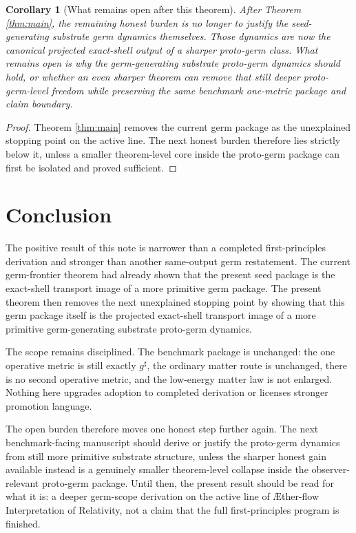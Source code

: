 \documentclass[11pt]{article}
\newcommand{\Aflow}{\AE{}ther-flow}
\newcommand{\TheoryName}{\Aflow{} Interpretation of Relativity}
\newcommand{\CompletedMetric}{g^{\sharp}}
\newtheorem{corollary}{Corollary}
\begin{document}
\begin{corollary}[What remains open after this theorem]
\label{cor:next}
After Theorem \ref{thm:main}, the remaining honest burden is no longer to justify the seed-generating substrate germ dynamics themselves. Those dynamics are now the canonical projected exact-shell output of a sharper proto-germ class. What remains open is why the germ-generating substrate proto-germ dynamics should hold, or whether an even sharper theorem can remove that still deeper proto-germ-level freedom while preserving the same benchmark one-metric package and claim boundary.
\end{corollary}

\begin{proof}
Theorem \ref{thm:main} removes the current germ package as the unexplained stopping point on the active line. The next honest burden therefore lies strictly below it, unless a smaller theorem-level core inside the proto-germ package can first be isolated and proved sufficient.
\end{proof}

\section{Conclusion}

The positive result of this note is narrower than a completed first-principles derivation and stronger than another same-output germ restatement. The current germ-frontier theorem had already shown that the present seed package is the exact-shell transport image of a more primitive germ package. The present theorem then removes the next unexplained stopping point by showing that this germ package itself is the projected exact-shell transport image of a more primitive germ-generating substrate proto-germ dynamics.

The scope remains disciplined. The benchmark package is unchanged: the one operative metric is still exactly \(\CompletedMetric\), the ordinary matter route is unchanged, there is no second operative metric, and the low-energy matter law is not enlarged. Nothing here upgrades adoption to completed derivation or licenses stronger promotion language.

The open burden therefore moves one honest step further again. The next benchmark-facing manuscript should derive or justify the proto-germ dynamics from still more primitive substrate structure, unless the sharper honest gain available instead is a genuinely smaller theorem-level collapse inside the observer-relevant proto-germ package. Until then, the present result should be read for what it is: a deeper germ-scope derivation on the active line of \TheoryName{}, not a claim that the full first-principles program is finished.
\end{document}
